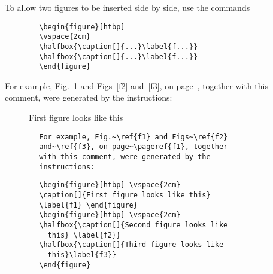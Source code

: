 To allow two figures to be inserted side by side, use the commands
\begin{verbatim}
        \begin{figure}[htbp]
        \vspace{2cm}
        \halfbox{\caption[]{...}\label{f...}}
        \halfbox{\caption[]{...}\label{f...}}
        \end{figure}
\end{verbatim}
 
        For example, Fig.~\ref{f1} and Figs~\ref{f2}
        and~\ref{f3}, on page~\pageref{f1}, together
        with this comment, were generated by the
        instructions:
 
        \begin{figure}[htbp] \vspace{2cm}
        \caption[]{First figure looks like this}
        \label{f1} \end{figure}
        \begin{figure}[htbp] \vspace{2cm}
        \end{figure}
 
\begin{verbatim}
        For example, Fig.~\ref{f1} and Figs~\ref{f2}
        and~\ref{f3}, on page~\pageref{f1}, together
        with this comment, were generated by the
        instructions:
\end{verbatim}
 
\begin{verbatim}
        \begin{figure}[htbp] \vspace{2cm}
        \caption[]{First figure looks like this}
        \label{f1} \end{figure}
        \begin{figure}[htbp] \vspace{2cm}
        \halfbox{\caption[]{Second figure looks like
          this} \label{f2}}
        \halfbox{\caption[]{Third figure looks like
          this}\label{f3}}
        \end{figure}
\end{verbatim}
 
